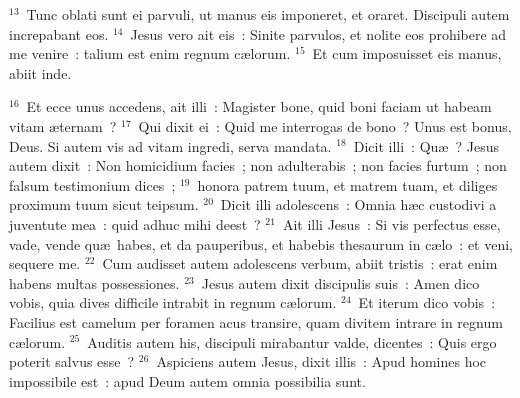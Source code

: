 ${}^{13}$~Tunc oblati sunt ei parvuli, ut manus eis imponeret, et oraret. Discipuli autem increpabant eos.
${}^{14}$~Jesus vero ait eis~: Sinite parvulos, et nolite eos prohibere ad me venire~: talium est enim regnum c\ae lorum.
${}^{15}$~Et cum imposuisset eis manus, abiit inde.


${}^{16}$~Et ecce unus accedens, ait illi~: Magister bone, quid boni faciam ut habeam vitam \ae ternam~?
${}^{17}$~Qui dixit ei~: Quid me interrogas de bono~? Unus est bonus, Deus. Si autem vis ad vitam ingredi, serva mandata.
${}^{18}$~Dicit illi~: Qu\ae~? Jesus autem dixit~: Non homicidium facies~; non adulterabis~; non facies furtum~; non falsum testimonium dices~;
${}^{19}$~honora patrem tuum, et matrem tuam, et diliges proximum tuum sicut teipsum.
${}^{20}$~Dicit illi adolescens~: Omnia h\ae c custodivi a juventute mea~: quid adhuc mihi deest~?
${}^{21}$~Ait illi Jesus~: Si vis perfectus esse, vade, vende qu\ae\ habes, et da pauperibus, et habebis thesaurum in c\ae lo~: et veni, sequere me.
${}^{22}$~Cum audisset autem adolescens verbum, abiit tristis~: erat enim habens multas possessiones.
${}^{23}$~Jesus autem dixit discipulis suis~: Amen dico vobis, quia dives difficile intrabit in regnum c\ae lorum.
${}^{24}$~Et iterum dico vobis~: Facilius est camelum per foramen acus transire, quam divitem intrare in regnum c\ae lorum.
${}^{25}$~Auditis autem his, discipuli mirabantur valde, dicentes~: Quis ergo poterit salvus esse~?
${}^{26}$~Aspiciens autem Jesus, dixit illis~: Apud homines hoc impossibile est~: apud Deum autem omnia possibilia sunt.


